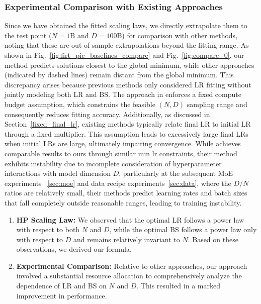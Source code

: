 \documentclass[11pt]{article}
\begin{document}
    

    \subsubsection{Experimental Comparison with Existing Approaches}

    \label{sec:validation}
    Since we have obtained the fitted scaling laws, we directly extrapolate them
    to the test point ($N=1$B and $D=100$B) for comparison with other methods, noting that these
    are out-of-sample extrapolations beyond the fitting range. As shown in Fig.~\ref{fig:firt_pic_baselines_compare}
    and Fig.~\ref{fig:compare_0}, our method predicts solutions closest to the global
    minimum, while other approaches (indicated by dashed lines) remain distant
    from the global minimum. This discrepancy arises because previous methods only
    considered LR fitting without jointly modeling both LR and BS. The approach in \cite{DeepSeek-AI2024} enforces a fixed compute
    budget assumption, which constrains the feasible $(N, D)$ sampling range and
    consequently reduces fitting accuracy. Additionally, as discussed in Section~\ref{fixed_final_lr},
    existing methods typically relate final LR to initial LR through a fixed
    multiplier. This assumption leads to excessively large final LRs when initial
    LRs are large, ultimately impairing convergence. While \citet{Porian2024}
    achieves comparable results to ours through similar $\mathrm{min\_lr}$
    constraints, their method exhibits instability due to incomplete consideration
    of hyperparameter interactions with model dimension $D$, particularly at the subsequent MoE experiments ~\ref{sec:moe} and data recipe experiments~\ref{sec:data}, where the $D/N$ ratios are relatively small, their methods predict learning rates and batch sizes that fall completely outside reasonable ranges, leading to training instability.

    \begin{tcolorbox}
    [callout={Key Takeaways}]
    \begin{enumerate}[\textbullet]
        \item \textbf{HP Scaling Law:} We observed that the optimal LR follows a power law with respect to both $N$ and $D$, while the optimal BS follows a power law only with respect to $D$ and remains relatively invariant to $N$. Based on these observations, we derived our formula.

        \item \textbf{Experimental Comparison:} Relative to other approaches, our approach involved a substantial resource allocation to comprehensively analyze the dependence of LR and BS on $N$ and $D$. This resulted in a marked improvement in performance.
    \end{enumerate}
    \end{tcolorbox}
\end{document}
